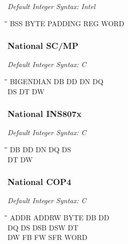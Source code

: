 {\em Default Integer Syntax: Intel}

{\tt\begin{tabbing}
\hspace{3cm}\=\hspace{3cm}\=\hspace{3cm}\=\hspace{3cm}\=\kill
BSS        \> BYTE        \> PADDING     \> REG         \> WORD \\
\end{tabbing}}

\subsubsection{National SC/MP}

{\em Default Integer Syntax: C}

{\tt\begin{tabbing}
\hspace{3cm}\=\hspace{3cm}\=\hspace{3cm}\=\hspace{3cm}\=\kill
BIGENDIAN  \> DB         \> DD          \> DN          \> DQ \\
DS         \> DT         \> DW \\
\end{tabbing}}
	
\subsubsection{National INS807x}

{\em Default Integer Syntax: C}

{\tt\begin{tabbing}
\hspace{3cm}\=\hspace{3cm}\=\hspace{3cm}\=\hspace{3cm}\=\kill
DB         \> DD          \> DN          \> DQ          \> DS \\
DT         \> DW \\
\end{tabbing}}
        
\subsubsection{National COP4}

{\em Default Integer Syntax: C}

{\tt\begin{tabbing}
\hspace{3cm}\=\hspace{3cm}\=\hspace{3cm}\=\hspace{3cm}\=\kill
ADDR       \> ADDRW       \> BYTE        \> DB          \> DD \\
DQ         \> DS          \> DSB         \> DSW         \> DT \\
DW         \> FB          \> FW          \> SFR         \> WORD \\
\end{tabbing}}

